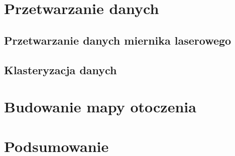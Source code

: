 \documentclass[eng,printmode]{mgr}
\begin{document}
    \chapter{Przetwarzanie danych}
    \section{Przetwarzanie danych miernika laserowego}
    \section{Klasteryzacja danych}

    \chapter{Budowanie mapy otoczenia}


    \chapter{Podsumowanie}
\end{document}
